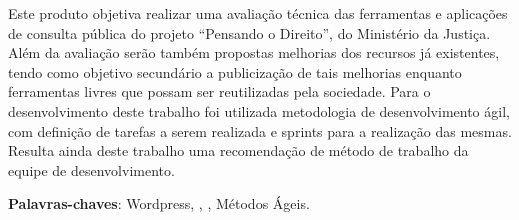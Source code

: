 \setlength{\absparsep}{18pt} %
\begin{resumo}
Este produto objetiva realizar uma avaliação técnica das ferramentas e aplicações de consulta pública do projeto “Pensando o Direito”, do Ministério da Justiça. Além da avaliação serão também propostas melhorias dos recursos já existentes, tendo como objetivo secundário a publicização de tais melhorias enquanto ferramentas livres que possam ser reutilizadas pela sociedade. Para o desenvolvimento deste trabalho foi utilizada metodologia de desenvolvimento ágil, com definição de tarefas a serem realizada e sprints para a realização das mesmas. Resulta ainda deste trabalho uma recomendação de método de trabalho da equipe de desenvolvimento.

 \noindent
 \textbf{Palavras-chaves}: Wordpress, \mc, \pdp, Métodos Ágeis.
\end{resumo}
